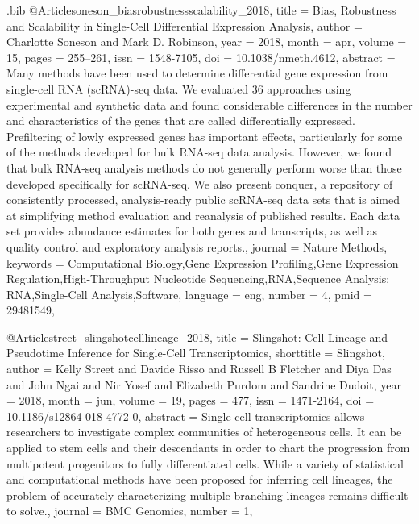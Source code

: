 \documentclass[
  table,
  10pt,
  a4paper]{article}
\begin{document}
\begin{filecontents}{\jobname.bib}
@Article{soneson_biasrobustnessscalability_2018,
	title = {Bias, Robustness and Scalability in Single-Cell Differential Expression Analysis},
	author = {Charlotte Soneson and Mark D. Robinson},
	year = {2018},
	month = {apr},
	volume = {15},
	pages = {255--261},
	issn = {1548-7105},
	doi = {10.1038/nmeth.4612},
	abstract = {Many methods have been used to determine differential gene expression from single-cell RNA (scRNA)-seq data. We evaluated 36 approaches using experimental and synthetic data and found considerable differences in the number and characteristics of the genes that are called differentially expressed. Prefiltering of lowly expressed genes has important effects, particularly for some of the methods developed for bulk RNA-seq data analysis. However, we found that bulk RNA-seq analysis methods do not generally perform worse than those developed specifically for scRNA-seq. We also present conquer, a repository of consistently processed, analysis-ready public scRNA-seq data sets that is aimed at simplifying method evaluation and reanalysis of published results. Each data set provides abundance estimates for both genes and transcripts, as well as quality control and exploratory analysis reports.},
	journal = {Nature Methods},
	keywords = {Computational Biology,Gene Expression Profiling,Gene Expression Regulation,High-Throughput Nucleotide Sequencing,RNA,Sequence Analysis; RNA,Single-Cell Analysis,Software},
	language = {eng},
	number = {4},
	pmid = {29481549},
}

@Article{street_slingshotcelllineage_2018,
	title = {Slingshot: {{Cell Lineage}} and {{Pseudotime Inference}} for {{Single}}-{{Cell Transcriptomics}}},
	shorttitle = {Slingshot},
	author = {Kelly Street and Davide Risso and Russell B Fletcher and Diya Das and John Ngai and Nir Yosef and Elizabeth Purdom and Sandrine Dudoit},
	year = {2018},
	month = {jun},
	volume = {19},
	pages = {477},
	issn = {1471-2164},
	doi = {10.1186/s12864-018-4772-0},
	abstract = {Single-cell transcriptomics allows researchers to investigate complex communities of heterogeneous cells. It can be applied to stem cells and their descendants in order to chart the progression from multipotent progenitors to fully differentiated cells. While a variety of statistical and computational methods have been proposed for inferring cell lineages, the problem of accurately characterizing multiple branching lineages remains difficult to solve.},
	journal = {BMC Genomics},
	number = {1},
}


\end{filecontents}
\end{document}

